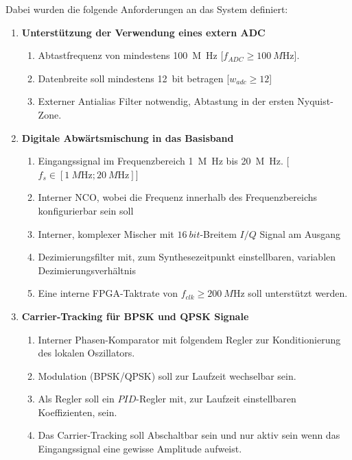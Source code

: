 Dabei wurden die folgende Anforderungen an das System definiert:
\begin{enumerate}
	\item \textbf{Unterstützung der Verwendung eines extern \acs{ADC}}
	\begin{enumerate}[label*=\arabic*.]
		\item Abtastfrequenz von mindestens \qty{100}{M\hertz} [$f_{ADC} \ge \qty{100}{M\hertz}$].
		\item Datenbreite soll mindestens \qty{12}{bit} betragen [$w_{adc} \ge 12$]
		\item Externer Antialias Filter notwendig, Abtastung in der ersten Nyquist-Zone.
	\end{enumerate}

	\item \textbf{Digitale Abwärtsmischung in das Basisband}
	\begin{enumerate}[label*=\arabic*.]
		\item Eingangssignal im Frequenzbereich \qty{1}{M\hertz} bis \qty{20}{M\hertz}. [$f_s \in [\qty{1}{M\hertz};\qty{20}{M\hertz}]$]
		\item Interner \acl{NCO}, wobei die Frequenz innerhalb des Frequenzbereichs konfigurierbar sein soll
		\item Interner, komplexer Mischer mit $\qty{16}{bit}$-Breitem $I/Q$ Signal am Ausgang
		\item Dezimierungsfilter mit, zum Synthesezeitpunkt einstellbaren, variablen Dezimierungsverhältnis
		\item Eine interne \acs{FPGA}-Taktrate von $f_{clk} \ge \qty{200}{M\hertz}$ soll unterstützt werden.
	\end{enumerate}

	\item \textbf{Carrier-Tracking für \acs{BPSK} und \acs{QPSK} Signale}
	\begin{enumerate}[label*=\arabic*.]
		\item Interner Phasen-Komparator mit folgendem Regler zur Konditionierung des lokalen Oszillators.
		\item Modulation (\acs{BPSK}/\acs{QPSK}) soll zur Laufzeit wechselbar sein.
		\item Als Regler soll ein $PID$-Regler mit, zur Laufzeit einstellbaren Koeffizienten, sein.
		\item Das Carrier-Tracking soll Abschaltbar sein und nur aktiv sein wenn das Eingangssignal eine gewisse Amplitude aufweist.
	\end{enumerate}


\end{enumerate}
